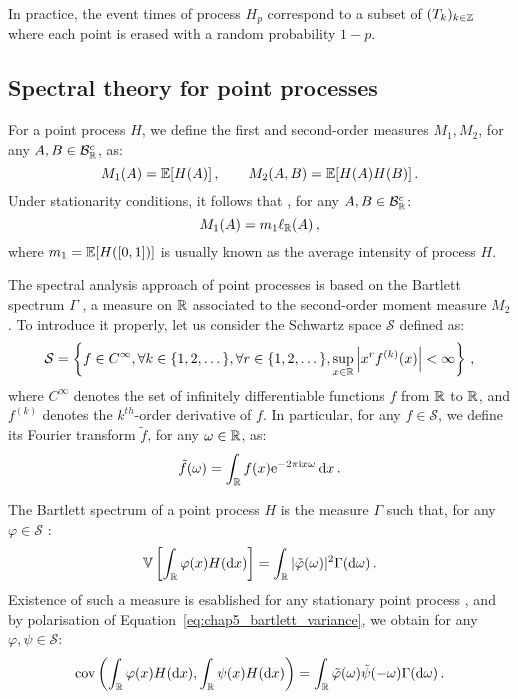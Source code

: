 In practice, the event times of process $H_p$ correspond to a subset of $(T_k)_{k\in{\mathbb Z}}$ where each point
is erased with a random probability $1-p$. 

\subsection{Spectral theory for point processes}

For a point process $H$, we define the first and second-order measures $M_1, M_2$, for any $A, B\in\mathcal{B}_{{\mathbb R}}^c$, as:
\[M_1(A) = {\mathbb E}[H(A)]\,,\qquad M_2(A,B) = {\mathbb E}[H(A)H(B)]\,.\]
Under stationarity conditions, it follows that \parencite[Proposition 8.1.I]{DaleyV1}, for any $A, B\in\mathcal{B}_{{\mathbb R}}^c$:
\[M_1(A) = m_1 \ell_{{\mathbb R}}(A)\,,\]
where $m_1 = {\mathbb E}[H([0,1])]$ is usually known as the average intensity of process $H$.

The spectral analysis approach of point processes is based on the Bartlett spectrum $\Gamma$ \parencite{Bartlett1963}, 
a measure on ${\mathbb R}$ associated to the second-order moment measure $M_2$. 
To introduce it properly, let us consider the Schwartz space $\mathcal{S}$ defined as:
\[
    \mathcal S = \left\{ f \in C^\infty, \forall k \in \{1, 2, \dots\}, \forall r \in \{1, 2, \dots\},
    \sup_{x \in {\mathbb R}} \left| x^r
    f^{(k)}(x)
    \right| < \infty \right\}\,,
\] where $C^\infty$ denotes the set of infinitely differentiable functions $f$ from ${\mathbb R}$ to ${\mathbb R}$, 
and $f^{(k)}$ denotes the $k^{th}$-order derivative of $f$.
In particular, for any $f\in\mathcal{S}$, we define its Fourier transform $\tilde f$, for any $\omega\in{\mathbb R}$, as:
\[\tilde f (\omega) = \int_{{\mathbb R}}{f(x) \mathrm{e}^{-2\pi\mathrm{i} x \omega}\,{\mathrm{d}} x}\,.\]

The Bartlett spectrum of a point process $H$ is the measure $\Gamma$ such that, 
for any $\varphi\in\mathcal{S}$ \parencite[Definition 2]{Bremaud2005}:
\begin{equation}\label{eq:chap5_bartlett_variance}
    {\mathbb V}\left[\int_{{\mathbb R}}{\varphi(x)H({\mathrm{d}} x)}\right] = \int_{{\mathbb R}}{|\tilde\varphi(\omega)|^2\Gamma({\mathrm{d}} \omega)}\,.
\end{equation}
Existence of such a measure is esablished for any stationary point process \parencite[Proposition 8.2.I.(a)]{DaleyV1},
and by polarisation of Equation~\eqref{eq:chap5_bartlett_variance}, we obtain for any $\varphi, \psi \in \mathcal{S}$:
\begin{equation}\label{eq:chap5_bartlett_covariance}
    \operatorname{cov}\left(\int_{{\mathbb R}}{\varphi(x)H({\mathrm{d}} x)}, \int_{{\mathbb R}}{\psi(x)H({\mathrm{d}} x)}\right) = \int_{{\mathbb R}}{\tilde \varphi(\omega)\tilde \psi(-\omega)\Gamma({\mathrm{d}} \omega)}\,.
\end{equation}

